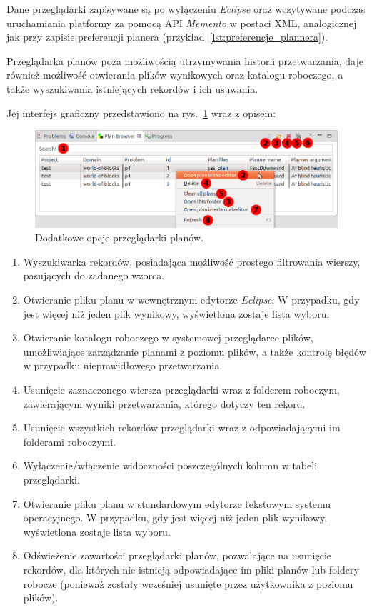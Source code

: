 Dane przeglądarki zapisywane są po wyłączeniu \emph{Eclipse} oraz wczytywane podczas uruchamiania platformy za pomocą API \emph{Memento} w postaci XML, analogicznej jak przy zapisie preferencji planera (przykład~\ref{lst:preferencje_plannera}).

Przeglądarka planów poza możliwością utrzymywania historii przetwarzania, daje również możliwość otwierania plików wynikowych oraz katalogu roboczego, a także wyszukiwania istniejących rekordów i ich usuwania. 

Jej interfejs graficzny przedstawiono na rys.~\ref{fig:plan_browser_options} wraz z opisem:

\begin{figure}[h!]
    \centering
    \includegraphics[width=\textwidth]{img/plan_browser_options}
    \caption{Dodatkowe opcje przeglądarki planów.}
    \label{fig:plan_browser_options}
\end{figure}

\begin{enumerate}[label=\protect\circled{\arabic*}]
\item Wyszukiwarka rekordów, posiadająca możliwość prostego filtrowania wierszy, pasujących do zadanego wzorca.
\item Otwieranie pliku planu w wewnętrznym edytorze \emph{Eclipse}. W przypadku, gdy jest więcej niż jeden plik wynikowy, wyświetlona zostaje lista wyboru.
\item Otwieranie katalogu roboczego w systemowej przeglądarce plików, umożliwiające zarządzanie planami z poziomu plików, a także kontrolę błędów w przypadku nieprawidłowego przetwarzania.
\item Usunięcie zaznaczonego wiersza przeglądarki wraz z folderem roboczym, zawierającym wyniki przetwarzania, którego dotyczy ten rekord.
\item Usunięcie wszystkich rekordów przeglądarki wraz z odpowiadającymi im folderami roboczymi.
\item Wyłączenie/włączenie widoczności poszczególnych kolumn w tabeli przeglądarki.
\item Otwieranie pliku planu w standardowym edytorze tekstowym systemu operacyjnego. W przypadku, gdy jest więcej niż jeden plik wynikowy, wyświetlona zostaje lista wyboru.
\item Odświeżenie zawartości przeglądarki planów, pozwalające na usunięcie rekordów, dla których nie istnieją odpowiadające im pliki planów lub foldery robocze (ponieważ zostały wcześniej usunięte przez użytkownika z poziomu plików).
\end{enumerate}

